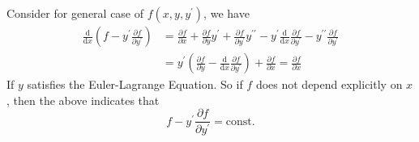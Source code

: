 \documentclass[a4paper]{article}
\begin{document}
Consider for general case of $f(x,y,y^\prime)$, we have
\begin{align*}
    \frac{\mathrm d}{\mathrm dx}\left( f-y^\prime\frac{\partial f}{\partial y^\prime} \right)&=\frac{\partial f}{\partial x}+\frac{\partial f}{\partial y}y^\prime+\frac{\partial f}{\partial y^\prime}y^{\prime\prime}-y^\prime\frac{\mathrm d}{\mathrm dx}\frac{\partial f}{\partial y^\prime}-y^{\prime\prime}\frac{\partial f}{\partial y^\prime}\\
    &=y^\prime\left( \frac{\partial f}{\partial y}-\frac{\mathrm d}{\mathrm dx}\frac{\partial f}{\partial y^\prime} \right)+\frac{\partial f}{\partial x}
    =\frac{\partial f}{\partial x}
\end{align*}
If $y$ satisfies the Euler-Lagrange Equation.
So if $f$ does not depend explicitly on $x$, then the above indicates that
$$f-y^\prime\frac{\partial f}{\partial y^\prime}=\text{const.}$$
\end{document}
